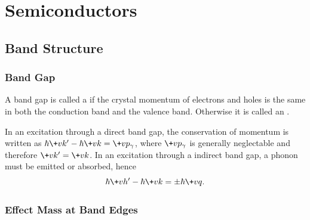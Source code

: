 \documentclass[hidelinks]{article}
\begin{document}
\section{Semiconductors} %
\label{sec:semiconductors}

\subsection{Band Structure} %
\label{sub:band_structure}

\subsubsection{Band Gap} %
\label{ssub:band_gap}

A band gap is called a  if the crystal momentum of electrons and holes is the same in both the conduction band and the valence band. Otherwise it is called an .
\par
In an excitation through a direct band gap, the conservation of momentum is written as $\hbar \+vk' - \hbar \+vk = \+vp_\gamma$, where $\+vp_\gamma$ is generally neglectable and therefore $\+vk' = \+vk$. In an excitation through a indirect band gap, a phonon must be emitted or absorbed, hence
\[ \hbar \+vh' - \hbar \+vk = \pm\hbar \+vq. \]


\subsubsection{Effect Mass at Band Edges} %
\label{ssub:effect_mass_at_band_edges}
\end{document}
